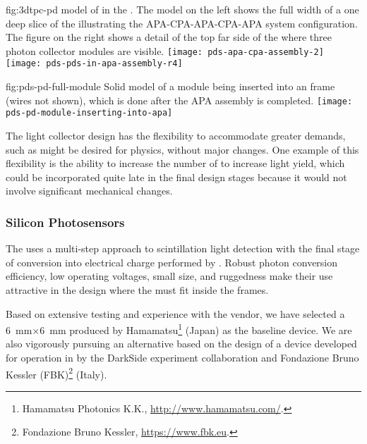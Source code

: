 \begin{dunefigure}{fig:3dtpc-pd}
{\threed model of  in the . The model on the left shows the full width of a one  deep slice of the  illustrating the APA-CPA-APA-CPA-APA system configuration. The figure on the right shows a detail of the top far side of the  where three photon collector modules are visible.}
\texttt{[image: pds-apa-cpa-assembly-2]}
\texttt{[image: pds-pds-in-apa-assembly-r4]}
\end{dunefigure}

\begin{dunefigure}{fig:pds-pd-full-module}
{Solid model of a  module being inserted into an  frame (wires not shown), which is done after the APA assembly is completed.}
\texttt{[image: pds-pd-module-inserting-into-apa]}
\end{dunefigure}

The  light collector design has the flexibility to accommodate greater demands, such as might be desired for  physics, without major changes. One example of this flexibility is the ability to increase the number of  to increase light yield, which could be incorporated quite late in the final design stages because it would not involve significant mechanical changes.

\subsubsection{Silicon Photosensors} 
\label{sssec:photosensors}

The   uses a multi-step approach to scintillation light detection with the final stage of conversion into electrical charge performed by . Robust photon conversion efficiency, low operating voltages, small size, and ruggedness make their use attractive in the  design where the  must fit inside the  frames. 

Based on extensive testing and experience with the vendor, we have selected a \SI{6}{mm}$\times$\SI{6}{mm}  %
produced by Hamamatsu\footnote{Hamamatsu\texttrademark{} Photonics K.K., \url{http://www.hamamatsu.com/}.} (Japan) as the baseline  device. 
We are also vigorously pursuing an alternative based on the design of a device developed for operation in  by the DarkSide experiment collaboration and Fondazione Bruno Kessler (FBK)\footnote{Fondazione Bruno Kessler\texttrademark{}, \url{https://www.fbk.eu}.} (Italy).

